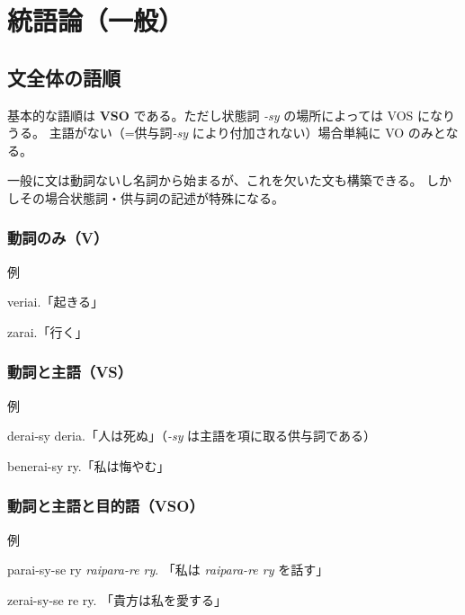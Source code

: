 \chapter{統語論（一般）}

\section{文全体の語順}

基本的な語順は \textbf{VSO} である。ただし状態詞 \emph{-sy} の場所によっては VOS になりうる。
主語がない（=供与詞\emph{-sy} により付加されない）場合単純に VO のみとなる。

一般に文は動詞ないし名詞から始まるが、これを欠いた文も構築できる。
しかしその場合状態詞・供与詞の記述が特殊になる。

\subsection{動詞のみ（V）}

\begin{itembox}[l]{例}
    \begin{pindent}
        \noindent
        veriai.「起きる」

        \noindent
        zarai.「行く」
    \end{pindent}
\end{itembox}

\subsection{動詞と主語（VS）}

\begin{itembox}[l]{例}
    \begin{pindent}
        \noindent
        derai-sy deria.「人は死ぬ」（\emph{-sy} は主語を項に取る供与詞である）

        \noindent
        benerai-sy ry.「私は悔やむ」
    \end{pindent}
\end{itembox}

\subsection{動詞と主語と目的語（VSO）}

\begin{itembox}[l]{例}
    \begin{pindent}
        \noindent
        parai-sy-se ry \emph{raipara-re ry}. 「私は \emph{raipara-re ry} を話す」

        \noindent
        zerai-sy-se re ry. 「貴方は私を愛する」
    \end{pindent}
\end{itembox}

